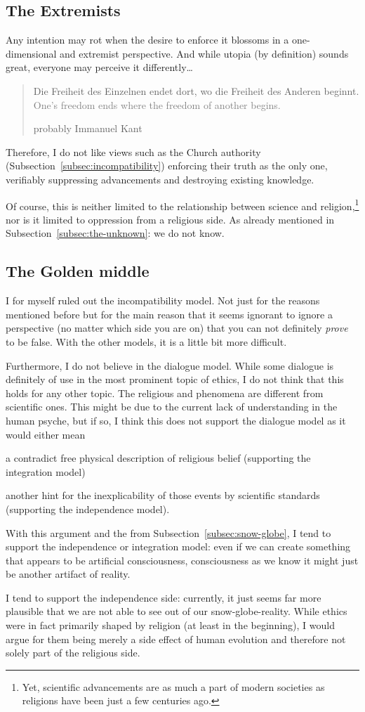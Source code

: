 \subsection{The Extremists}
Any intention may rot when the desire to enforce it blossoms in a one-dimensional and extremist perspective.
And while utopia (by definition) sounds great, everyone may perceive it differently\ldots
\blockquote[probably Immanuel Kant]{Die Freiheit des Einzelnen endet dort, wo die Freiheit des Anderen beginnt.\\\textcolor{gray}{One's freedom ends where the freedom of another begins.}}
Therefore, I do not like views such as the Church authority (Subsection~\ref{subsec:incompatibility}) enforcing their truth as the only one, verifiably suppressing advancements and destroying existing knowledge.

Of course, this is neither limited to the relationship between science and religion,\footnote{Yet, scientific advancements are as much a part of modern societies as religions have been just a few centuries ago.} nor is it limited to oppression from a religious side. As already mentioned in Subsection~\ref{subsec:the-unknown}: we do not know.


\subsection{The Golden middle}
\label{subsec:golden-middle}
I for myself ruled out the incompatibility model. Not just for the reasons mentioned before but for the main reason that it seems ignorant to ignore a perspective (no matter which side you are on) that you can not definitely \emph{prove} to be false.
With the other models, it is a little bit more difficult.

Furthermore, I do not believe in the dialogue model. While some dialogue is definitely of use in the most prominent topic of ethics, I do not think that this holds for any other topic. The religious  and phenomena are different from scientific ones. This might be due to the current lack of understanding in the human psyche, but if so, I think this does not support the dialogue model as it would either mean \begin{orlist}
    \item a contradict free physical description of religious belief (supporting the integration model)
    \item another hint for the inexplicability of those events by scientific standards (supporting the independence model).
\end{orlist}

With this argument and the  from Subsection~\ref{subsec:snow-globe}, I tend to support the independence or integration model: even if we can create something that appears to be artificial consciousness, consciousness as we know it might just be another artifact of  reality.

I tend to support the independence side: currently, it just seems far more plausible that we are not able to see out of our snow-globe-reality.
While ethics were in fact primarily shaped by religion (at least in the beginning), I would argue for them being merely a side effect of human evolution and therefore not solely part of the religious side.